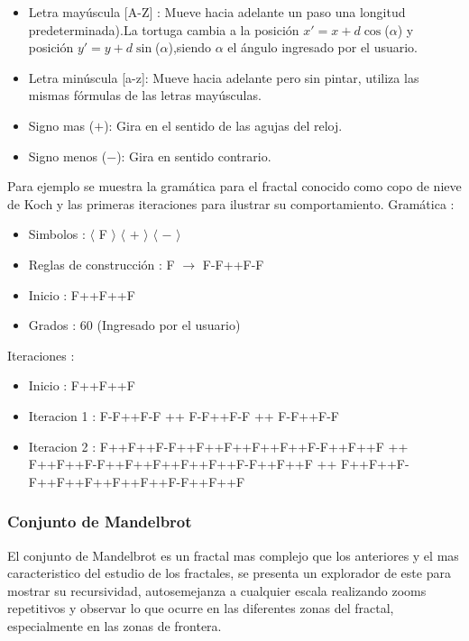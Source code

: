 \documentclass[letterpaper, 11pt, oneside]{article}
\theoremstyle{definition}
\theoremstyle{remark}
\begin{document}
\newpage

\begin{itemize}
  \item Letra mayúscula [A-Z] : Mueve hacia adelante un paso una longitud predeterminada).La tortuga cambia a la posición $x'= x + d \cos$($\alpha$) y posición $y'= y + d \sin$($\alpha$),siendo $\alpha$ el ángulo ingresado por el usuario. 
  \item Letra minúscula [a-z]: Mueve hacia adelante pero sin pintar, utiliza las mismas fórmulas de las letras mayúsculas. 
  \item Signo mas ($+$): Gira en el sentido de las agujas del reloj. 
  \item Signo menos ($-$): Gira en sentido contrario.
\end{itemize}

Para ejemplo se muestra la gramática para el fractal conocido como copo de nieve de Koch y las primeras iteraciones para ilustrar su comportamiento.
Gramática :
\begin{itemize}
  \item Simbolos : $\langle$ F $\rangle$  $\langle$ $+$ $\rangle$  $\langle$ $-$ $\rangle$
  \item Reglas de construcción : F $\rightarrow$ F-F++F-F
  \item Inicio : F++F++F
  \item Grados : 60 (Ingresado por el usuario)
\end{itemize}
Iteraciones :
\begin{itemize}
  \item Inicio : F++F++F
  \item Iteracion 1 : F-F++F-F ++ F-F++F-F ++ F-F++F-F
  \item Iteracion 2 : F++F++F-F++F++F++F++F++F-F++F++F ++ F++F++F-F++F++F++F++F++F-F++F++F ++ F++F++F-F++F++F++F++F++F-F++F++F
\end{itemize}

\subsubsection{Conjunto de Mandelbrot} 

 El conjunto de Mandelbrot es un fractal mas complejo que los anteriores y el mas caracteristico del estudio de los fractales, se presenta un explorador de este para mostrar su recursividad, autosemejanza a cualquier escala realizando zooms repetitivos y observar lo que ocurre en las diferentes zonas del fractal, especialmente en las zonas de frontera.
\end{document}
